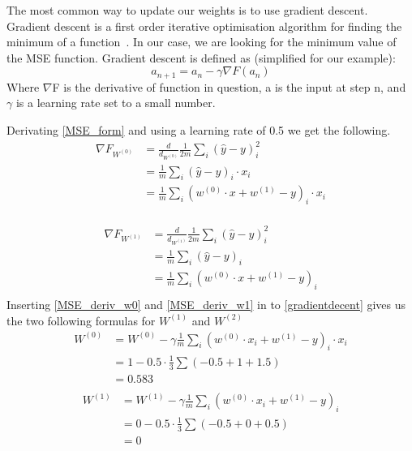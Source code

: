 The most common way to update our weights is to use gradient descent. 
Gradient descent is a first order iterative optimisation algorithm for finding the minimum of a function~\cite{robbins1951}. In our case, we are looking for the minimum value of the MSE function. Gradient descent is defined as (simplified for our example):
\begin{equation}
    a_{n+1}= a_{n} - \gamma \nabla F(a_{n})
    \label{gradientdecent}
\end{equation}
Where $\nabla$F is the derivative of function in question, a is the input at step n, and $\gamma$ is a learning rate set to a small number. 

Derivating \ref{MSE_form} and using a learning rate of 0.5 we get the following. 
\begin{equation}
	\label{MSE_deriv_w0}
	\begin{split}
    \nabla F_{W^{(0)}} &= \frac{d}{d_{W^{(0)}} } \frac{1}{2m} \sum_i (\hat{y}-y)_i^2 \\
     &= \frac{1}{m} \sum_{i}{(\hat{y}-y)}_{i} \cdot x_i\\
     &= \frac{1}{m} \sum_{i}{(w^{(0)} \cdot x + w^{(1)}-y)}_{i} \cdot x_i\\
	\end{split}
\end{equation}

\begin{equation}
	\label{MSE_deriv_w1}
	\begin{split}
     \nabla F_{W^{(1)}} &= \frac{d}{d_{W^{(1)}} } \frac{1}{2m} \sum_i (\hat{y}-y)_i^2 \\
				    &= \frac{1}{m} \sum_{i}{(\hat{y}-y)}_{i} \\
				    &= \frac{1}{m} \sum_{i}{(w^{(0)} \cdot x + w^{(1)}-y)}_{i}\\
    \end{split}
\end{equation}
Inserting \ref{MSE_deriv_w0} and \ref{MSE_deriv_w1} in to \ref{gradientdecent} gives us the two following formulas for $W^{(1)}$ and $W^{(2)}$
\begin{equation}
	\label{GD_W0}
	\begin{split}
    W^{(0)}  &= W^{(0)} - \gamma \frac{1}{m} \sum_{i}{(w^{(0)} \cdot x_i + w^{(1)}-y)}_{i} \cdot x_i \\
     		 &= 1 - 0.5 \cdot \frac{1}{3}  \sum (-0.5+1+1.5)  \\
     		 &= 0.583\\
	\end{split}
\end{equation}
\begin{equation}
	\label{GD_W0}
	\begin{split}
    W^{(1)}  &= W^{(1)} - \gamma \frac{1}{m} \sum_{i}{(w^{(0)} \cdot x_i + w^{(1)}-y)}_{i} \\
     		 &= 0 - 0.5 \cdot \frac{1}{3} \sum (-0.5+0+0.5) \\
     		 &= 0\\
	\end{split}
\end{equation}

